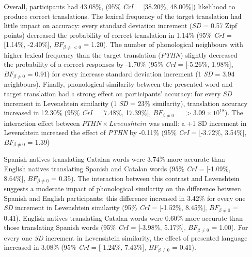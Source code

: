 \documentclass[
  english,
  man,floatsintext]{apa7}
\begin{document}
Overall, participants had 43.08\%, (95\% \emph{CrI} = {[}38.20\%, 48.00\%{]}) likelihood to produce correct translations. The lexical frequency of the target translation had little impact on accuracy: every standard deviation increment (\emph{SD} = 0.57 Zipf points) decreased the probability of correct translation in 1.14\% (95\% \emph{CrI} = {[}1.14\%, -2.40\%{]}, \(BF_{\beta\neq< 0}\) = 1.20). The number of phonological neighbours with higher lexical frequency than the target translation (\emph{PTHN}) slightly decreased the probability of a correct responses by -1.70\% (95\% \emph{CrI} = {[}-5.26\%, 1.98\%{]}, \(BF_{\beta \neq 0}\) = 0.91) for every increase standard deviation increment (1 \emph{SD} = 3.94 neighbours). Finally, phonological similarity between the presented word and target translation had a strong effect on participants' accuracy: for every \emph{SD} increment in Levenshtein similarity (1 \emph{SD} = 23\% similarity), translation accuracy increased in 12.30\% (95\% \emph{CrI} = {[}7.48\%, 17.39\%{]}, \(BF_{\beta \neq 0}\) = \(>3.09 \times 10^{18}\)). The interaction effect between \(PTHN \times Levenshtein\) was small: a +1 SD increment in Levenshtein increased the effect of \emph{PTHN} by -0.11\% (95\% \emph{CrI} = {[}-3.72\%, 3.54\%{]}, \(BF_{\beta \neq 0}\) = 1.39)

Spanish natives translating Catalan words were 3.74\% more accurate than English natives translating Spanish and Catalan words (95\% \emph{CrI} = {[}-1.09\%, 8.64\%{]}, \(BF_{\beta \neq 0}\) = 0.35). The interaction between this contrast and Levenshtein suggests a moderate impact of phonological similarity on the difference between Spanish and English participants: this difference increased in 3.42\% for every one \emph{SD} increment in Levenshtein similarity (95\% \emph{CrI} = {[}-1.52\%, 8.45\%{]}, \(BF_{\beta \neq 0}\) = 0.41). English natives translating Catalan words were 0.60\% more accurate than those translating Spanish words (95\% \emph{CrI} = {[}-3.98\%, 5.17\%{]}, \(BF_{\beta \neq 0}\) = 1.00). For every one \emph{SD} increment in Levenshtein similarity, the effect of presented language increased in 3.08\% (95\% \emph{CrI} = {[}-1.24\%, 7.43\%{]}, \(BF_{\beta \neq 0}\) = 0.41).
\end{document}
